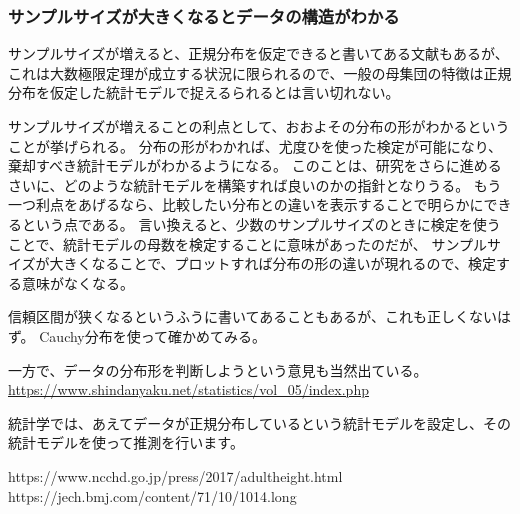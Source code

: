 \subsubsection{ サンプルサイズが大きくなるとデータの構造がわかる}
サンプルサイズが増えると、正規分布を仮定できると書いてある文献もあるが、これは大数極限定理が成立する状況に限られるので、一般の母集団の特徴は正規分布を仮定した統計モデルで捉えるられるとは言い切れない。


サンプルサイズが増えることの利点として、おおよその分布の形がわかるということが挙げられる。
分布の形がわかれば、尤度ひを使った検定が可能になり、棄却すべき統計モデルがわかるようになる。
このことは、研究をさらに進めるさいに、どのような統計モデルを構築すれば良いのかの指針となりうる。
もう一つ利点をあげるなら、比較したい分布との違いを表示することで明らかにできるという点である。
言い換えると、少数のサンプルサイズのときに検定を使うことで、統計モデルの母数を検定することに意味があったのだが、
サンプルサイズが大きくなることで、プロットすれば分布の形の違いが現れるので、検定する意味がなくなる。
\fi

信頼区間が狭くなるというふうに書いてあることもあるが、これも正しくないはず。
Cauchy分布を使って確かめてみる。
\fi 


一方で、データの分布形を判断しようという意見も当然出ている。
\url{https://www.shindanyaku.net/statistics/vol_05/index.php}
\fi 

統計学では、あえてデータが正規分布しているという統計モデルを設定し、その統計モデルを使って推測を行います。

https://www.ncchd.go.jp/press/2017/adultheight.html
https://jech.bmj.com/content/71/10/1014.long

\fi 
